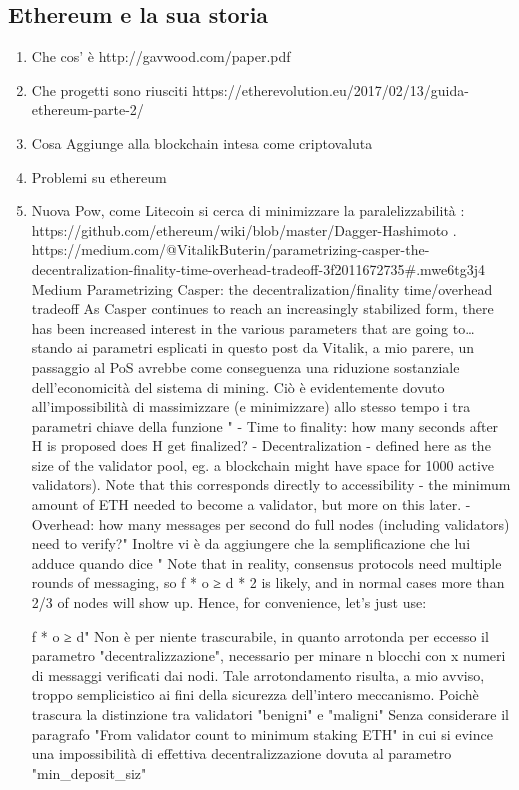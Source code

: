 \subsection{Ethereum e la sua storia}
	\iffalse
	\begin{enumerate}
		\item \uncheckedbox Che cos' è http://gavwood.com/paper.pdf
		\item \uncheckedbox Che progetti sono riusciti https://etherevolution.eu/2017/02/13/guida-ethereum-parte-2/
		\item \uncheckedbox Cosa Aggiunge alla blockchain intesa come criptovaluta 
		\item \uncheckedbox Problemi su ethereum
		\item \uncheckedbox Nuova Pow, come Litecoin si cerca di minimizzare la paralelizzabilità : https://github.com/ethereum/wiki/blob/master/Dagger-Hashimoto .
		\iffalse
		https://medium.com/@VitalikButerin/parametrizing-casper-the-decentralization-finality-time-overhead-tradeoff-3f2011672735\#.mwe6tg3j4
		Medium
		Parametrizing Casper: the decentralization/finality time/overhead tradeoff
		As Casper continues to reach an increasingly stabilized form, there has been increased interest in the various parameters that are going to…
		stando ai parametri esplicati in questo post da Vitalik, a mio parere, un passaggio al PoS avrebbe come conseguenza una riduzione sostanziale dell'economicità del sistema di mining. Ciò è evidentemente dovuto all'impossibilità di massimizzare (e minimizzare) allo stesso tempo i tra parametri chiave della funzione "  - Time to finality: how many seconds after H is proposed does H get finalized?
		- Decentralization - defined here as the size of the validator pool, eg. a blockchain might have space for 1000 active validators). Note that this corresponds directly to accessibility - the minimum amount of ETH needed to become a validator, but more on this later.
		- Overhead: how many messages per second do full nodes (including validators) need to verify?"
		Inoltre vi è da aggiungere che la semplificazione che lui adduce quando dice " Note that in reality, consensus protocols need multiple rounds of messaging, so f * o ≥ d * 2 is likely, and in normal cases more than 2/3 of nodes will show up. Hence, for convenience, let’s just use:
		
		f * o ≥ d"
		Non è per niente trascurabile, in quanto arrotonda per eccesso il parametro "decentralizzazione", necessario per minare n blocchi con x numeri di messaggi verificati dai nodi. Tale arrotondamento risulta, a mio avviso, troppo semplicistico ai fini della sicurezza dell'intero meccanismo. Poichè trascura la distinzione tra validatori "benigni" e "maligni"
		Senza considerare il paragrafo "From validator count to minimum staking ETH" in cui si evince una impossibilità di effettiva decentralizzazione dovuta al parametro "min_deposit_siz"
	

\end{enumerate}
